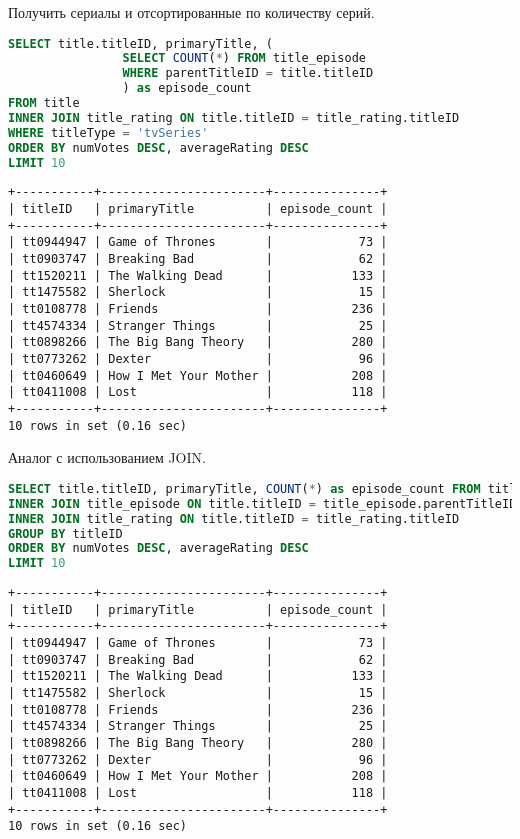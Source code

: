 \documentclass[12pt,a4paper]{article}
\begin{document}
Получить сериалы и отсортированные по количеству серий.

\begin{lstlisting}[language=SQL]
SELECT title.titleID, primaryTitle, (
				SELECT COUNT(*) FROM title_episode
				WHERE parentTitleID = title.titleID
				) as episode_count
FROM title
INNER JOIN title_rating ON title.titleID = title_rating.titleID
WHERE titleType = 'tvSeries'
ORDER BY numVotes DESC, averageRating DESC
LIMIT 10
\end{lstlisting}

\begin{lstlisting}[basicstyle = \tiny\ttfamily, columns = fixed]
+-----------+-----------------------+---------------+
| titleID   | primaryTitle          | episode_count |
+-----------+-----------------------+---------------+
| tt0944947 | Game of Thrones       |            73 |
| tt0903747 | Breaking Bad          |            62 |
| tt1520211 | The Walking Dead      |           133 |
| tt1475582 | Sherlock              |            15 |
| tt0108778 | Friends               |           236 |
| tt4574334 | Stranger Things       |            25 |
| tt0898266 | The Big Bang Theory   |           280 |
| tt0773262 | Dexter                |            96 |
| tt0460649 | How I Met Your Mother |           208 |
| tt0411008 | Lost                  |           118 |
+-----------+-----------------------+---------------+
10 rows in set (0.16 sec)
\end{lstlisting}

Аналог с использованием JOIN.
\begin{lstlisting}[language=SQL]
SELECT title.titleID, primaryTitle, COUNT(*) as episode_count FROM title
INNER JOIN title_episode ON title.titleID = title_episode.parentTitleID
INNER JOIN title_rating ON title.titleID = title_rating.titleID
GROUP BY titleID
ORDER BY numVotes DESC, averageRating DESC
LIMIT 10
\end{lstlisting}

\begin{lstlisting}[basicstyle = \tiny\ttfamily, columns = fixed]
+-----------+-----------------------+---------------+
| titleID   | primaryTitle          | episode_count |
+-----------+-----------------------+---------------+
| tt0944947 | Game of Thrones       |            73 |
| tt0903747 | Breaking Bad          |            62 |
| tt1520211 | The Walking Dead      |           133 |
| tt1475582 | Sherlock              |            15 |
| tt0108778 | Friends               |           236 |
| tt4574334 | Stranger Things       |            25 |
| tt0898266 | The Big Bang Theory   |           280 |
| tt0773262 | Dexter                |            96 |
| tt0460649 | How I Met Your Mother |           208 |
| tt0411008 | Lost                  |           118 |
+-----------+-----------------------+---------------+
10 rows in set (0.16 sec)
\end{lstlisting}
\end{document}
